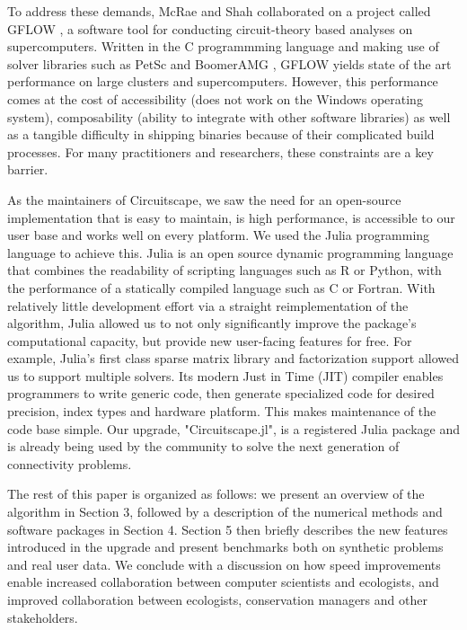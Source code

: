 \documentclass{juliacon}
\begin{document}
To address these demands, McRae and Shah collaborated on  a project called GFLOW \cite{leonard2017gflow}, a software tool for conducting circuit-theory based analyses on supercomputers. Written in the C programmming language and making use of solver libraries such as PetSc \cite{balay2004petsc} and BoomerAMG \cite{yang2002boomeramg}, GFLOW yields state of the art performance on large clusters and supercomputers. However, this performance comes at the cost of accessibility (does not work on the Windows operating system), composability (ability to integrate with other software libraries) as well as a tangible difficulty in shipping binaries because of their complicated build processes. For many practitioners and researchers, these constraints are a key barrier.

As the maintainers of Circuitscape, we saw the need for an open-source implementation that is easy to maintain, is high performance, is accessible to our user base and works well on every platform. We used the Julia programming language \cite{bezanson2017julia} to achieve this. Julia is an open source dynamic programming language that combines the readability of scripting languages such as R or Python, with the performance of a statically compiled language such as C or Fortran. With relatively little development effort via a straight reimplementation of the algorithm, Julia allowed us to not only significantly improve the package's computational capacity, but provide new user-facing features for free. For example, Julia's first class sparse matrix library and factorization support allowed us to support multiple solvers. Its modern Just in Time (JIT) compiler enables programmers to write generic code, then generate specialized code for desired precision, index types and hardware platform. This makes maintenance of the code base simple. Our upgrade, "Circuitscape.jl", is a registered Julia package and is already being used by the community to solve the next generation of connectivity problems.  

The rest of this paper is organized as follows: we present an overview of the algorithm in Section 3, followed by a description of the numerical methods and software packages in Section 4. Section 5 then briefly describes the new features introduced in the upgrade and present benchmarks both on synthetic problems and real user data. We conclude with a discussion on how speed improvements enable increased collaboration between computer scientists and ecologists, and improved collaboration between ecologists, conservation managers and other stakeholders. 
\end{document}
